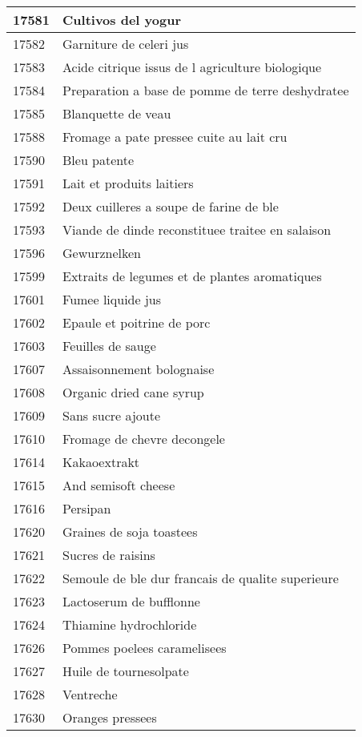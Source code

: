 \begin{longtable}{|l|l|}
17581 & Cultivos del yogur \\ \hline 
17582 & Garniture de celeri jus \\ \hline 
17583 & Acide citrique issus de l agriculture biologique \\ \hline 
17584 & Preparation a base de pomme de terre deshydratee \\ \hline 
17585 & Blanquette de veau \\ \hline 
17588 & Fromage a pate pressee cuite au lait cru \\ \hline 
17590 & Bleu patente \\ \hline 
17591 & Lait et produits laitiers \\ \hline 
17592 & Deux cuilleres a soupe de farine de ble \\ \hline 
17593 & Viande de dinde reconstituee traitee en salaison \\ \hline 
17596 & Gewurznelken \\ \hline 
17599 & Extraits de legumes et de plantes aromatiques \\ \hline 
17601 & Fumee liquide jus \\ \hline 
17602 & Epaule et poitrine de porc \\ \hline 
17603 & Feuilles de sauge \\ \hline 
17607 & Assaisonnement bolognaise \\ \hline 
17608 & Organic dried cane syrup \\ \hline 
17609 & Sans sucre ajoute \\ \hline 
17610 & Fromage de chevre decongele \\ \hline 
17614 & Kakaoextrakt \\ \hline 
17615 & And semisoft cheese \\ \hline 
17616 & Persipan \\ \hline 
17620 & Graines de soja toastees \\ \hline 
17621 & Sucres de raisins \\ \hline 
17622 & Semoule de ble dur francais de qualite superieure \\ \hline 
17623 & Lactoserum de bufflonne \\ \hline 
17624 & Thiamine hydrochloride \\ \hline 
17626 & Pommes poelees caramelisees \\ \hline 
17627 & Huile de tournesolpate \\ \hline 
17628 & Ventreche \\ \hline 
17630 & Oranges pressees \\ \hline 

\end{longtable}
